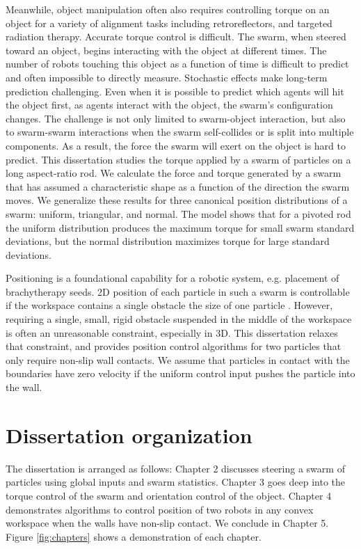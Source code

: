  Meanwhile, object manipulation often also requires controlling torque on an object for a variety of alignment tasks including retroreflectors, and targeted radiation therapy.
 Accurate torque control is difficult.
 The swarm, when steered toward an object, begins interacting with the object at different times. 
The number of robots touching this object as a function of time is difficult to predict and often impossible to directly measure.
Stochastic effects make long-term prediction challenging.  
Even when it is possible to predict which agents will hit the object first, as agents interact with the object, the swarm's configuration changes.
The challenge is not only limited to swarm-object interaction, but also to swarm-swarm interactions when the swarm self-collides  or is split into multiple components.
 As a result, the force the swarm will exert on the object is hard to predict.
 This dissertation studies the torque applied by a swarm of particles on a long aspect-ratio rod. We calculate the force and torque generated by a swarm that has assumed a characteristic shape as a function of the direction the swarm moves.
We generalize these results for three canonical position distributions of a swarm: uniform, triangular, and normal. The model shows that for a pivoted rod the uniform distribution produces the maximum torque for small swarm standard deviations, but the normal distribution maximizes torque for large standard deviations.


 Positioning is a foundational capability for a robotic system, e.g. placement of brachytherapy seeds. 
 2D position of each particle in such a swarm is controllable if the workspace contains a single obstacle the size of one particle \cite{AaronManipulation2013}.
 However, requiring a single, small, rigid obstacle suspended in the middle of the workspace is often an unreasonable constraint, especially in 3D.
 This dissertation relaxes that constraint, and provides position control algorithms for two particles that only require non-slip wall contacts.
 We assume that particles in contact with the boundaries have zero velocity if the uniform control input pushes the particle into the wall.
 
\section{Dissertation organization}

The dissertation is arranged as follows: Chapter 2 discusses steering a swarm of particles using global inputs and swarm statistics. Chapter 3 goes deep into the torque control of the swarm and orientation control of the object. Chapter 4 demonstrates algorithms to control position of two robots in any convex workspace when the walls have non-slip contact. We conclude in Chapter 5. Figure \ref{fig:chapters} shows a demonstration of each chapter.


